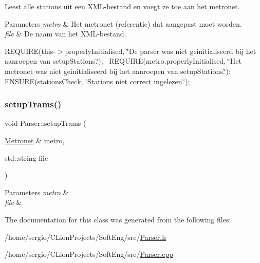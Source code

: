 Leest alle stations uit een X\+M\+L-\/bestand en voegt ze toe aan het metronet. 


\begin{DoxyParams}{Parameters}
{\em metro} & Het metronet (referentie) dat aangepast moet worden. \\
\hline
{\em file} & De naam van het X\+M\+L-\/bestand.\\
\hline
\end{DoxyParams}
R\+E\+Q\+U\+I\+RE(this-\/$>$properly\+Initialised, \char`\"{}\+De parser was niet geinitialiseerd bij het aanroepen van setup\+Stations.\char`\"{});~\newline
R\+E\+Q\+U\+I\+RE(metro.\+properly\+Initialised, \char`\"{}\+Het metronet was niet geinitialiseerd bij het aanroepen van setup\+Stations.\char`\"{});~\newline
E\+N\+S\+U\+RE(stations\+Check, \char`\"{}\+Stations niet correct ingelezen.\char`\"{});~\newline
\mbox{\label{class_parser_a45cd97dbe3549de6667cb7255f8d51fe}} 
\subsubsection{\texorpdfstring{setup\+Trams()}{setupTrams()}}
{\footnotesize\ttfamily void Parser\+::setup\+Trams (\begin{DoxyParamCaption}\item[{\hyperlink{class_metronet}{Metronet} \&}]{metro,  }\item[{std\+::string}]{file }\end{DoxyParamCaption})}


\begin{DoxyParams}{Parameters}
{\em metro} & \\
\hline
{\em file} & \\
\hline
\end{DoxyParams}


The documentation for this class was generated from the following files\+:\begin{DoxyCompactItemize}
\item 
/home/sergio/\+C\+Lion\+Projects/\+Soft\+Eng/src/\hyperlink{_parser_8h}{Parser.\+h}\item 
/home/sergio/\+C\+Lion\+Projects/\+Soft\+Eng/src/\hyperlink{_parser_8cpp}{Parser.\+cpp}\end{DoxyCompactItemize}
